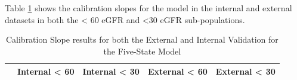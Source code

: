 \documentclass[
]{article}
\begin{document}
Table \ref{tab:Five-Valid-Slope} shows the calibration slopes for the model in the internal and external datasets in both the \textless{} 60 eGFR and \textless30 eGFR sub-populations.
\begin{table}[!h]

\caption{\label{tab:Five-Valid-Slope}{\small Calibration Slope results for both the External and Internal Validation for the Five-State Model}}
\centering
\fontsize{7}{9}\selectfont
\begin{tabular}[t]{>{\raggedright\arraybackslash}p{20em}>{\ttfamily\raggedleft\arraybackslash}p{20em}>{\ttfamily\raggedleft\arraybackslash}p{20em}>{\ttfamily\raggedleft\arraybackslash}p{20em}>{\ttfamily\raggedleft\arraybackslash}p{20em}}
\toprule
  & Internal < 60 & Internal < 30 & External < 60 & External < 30\\
\midrule

\end{tabular}
\end{table}
\end{document}
